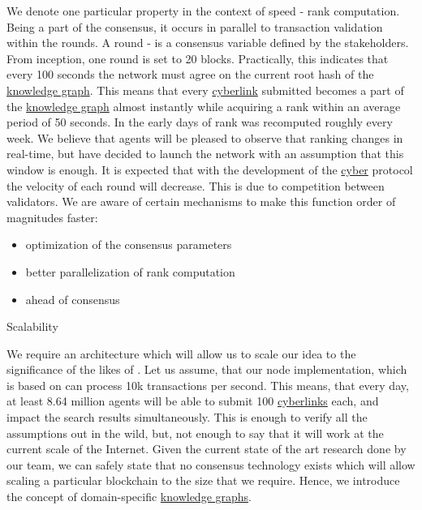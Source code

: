 \documentclass[8pt,oneside]{amsart}
\makeatletter
\newcommand{\linkred}[2]{\href{#1}{\color{red}{#2}}}
\renewcommand\subsection{\@startsection{subsection}
                                    {2}{\z@}
                                    {-3.25ex\@plus -1ex \@minus -.2ex}
                                    {0ex \@plus .2ex}
                                    {\play\Large}
                        }
\newcommand{\titleSection}[1]{\subsection{#1}}
\makeatother
\begin{document}
We denote one particular \linkred{https://github.com/cybercongress/go-cyber}{go-cyber} property in the context of speed - rank computation. Being a part of the consensus, it occurs in parallel to transaction validation within the rounds. A round - is a consensus variable defined by the stakeholders. From inception, one round is set to 20 blocks. Practically, this indicates that every 100 seconds the network must agree on the current root hash of the {\hyperref[knowledge-graph]{knowledge graph}}. This means that every {\hyperref[cyberlinks]{cyberlink}} submitted becomes a part of the {\hyperref[knowledge-graph]{knowledge graph}} almost instantly while acquiring a rank within an average period of 50 seconds. In the early days of \linkred{https://google.com}{Google} rank was recomputed roughly every week. We believe that agents will be pleased to observe that ranking changes in real-time, but have decided to launch the network with an assumption that this window is enough. It is expected that with the development of the {\hyperref[cyber]{cyber}} protocol the velocity of each round will decrease. This is due to competition between validators. We are aware of certain mechanisms to make this function order of magnitudes faster:

\begin{itemize}
\item optimization of the consensus parameters
\item better parallelization of rank computation
\item \linkred{https://ipfs.io/ipfs/QmZKchdeBtUeZKvsFbuWY2PHg6qn6jHjUDrg5KjHzDGWHj}{better clock} ahead of consensus
\end{itemize}

\titleSection{Scalability}\label{scalability}

We require an architecture which will allow us to scale our idea to the significance of the likes of \linkred{https://google.com}{Google}. Let us assume, that our node implementation, which is based on \linkred{https://github.com/cosmos/cosmos-sdk}{Cosmos-SDK} can process 10k transactions per second. This means, that every day, at least 8.64 million agents will be able to submit 100 {\hyperref[cyberlinks]{cyberlinks}} each, and impact the search results simultaneously. This is enough to verify all the assumptions out in the wild, but, not enough to say that it will work at the current scale of the Internet. Given the current state of the art research done by our team, we can safely state that no consensus technology exists which will allow scaling a particular blockchain to the size that we require. Hence, we introduce the concept of domain-specific {\hyperref[knowledge-graph]{knowledge graphs}}.
\end{document}
